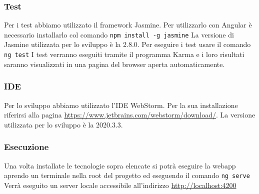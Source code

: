 \subsubsection{Test}
Per i test abbiamo utilizzato il framework Jasmine. Per utilizzarlo con Angular è necessario installarlo col comando \texttt{npm install -g jasmine} \newline
La versione di Jasmine utilizzata per lo sviluppo è la 2.8.0. \newline
Per eseguire i test usare il comando \texttt{ng test} \newline
I test verranno eseguiti tramite il programma Karma e i loro risultati saranno visualizzati in una pagina del browser aperta automaticamente.

\subsubsection{IDE}
Per lo sviluppo abbiamo utilizzato l'IDE WebStorm. Per la sua installazione riferirsi alla pagina \url{https://www.jetbrains.com/webstorm/download/}. La versione utilizzata per lo sviluppo è la 2020.3.3.

\subsubsection{Esecuzione}
Una volta installate le tecnologie sopra elencate si potrà eseguire la webapp aprendo un terminale nella root del progetto ed eseguendo il comando \texttt{ng serve} \newline
Verrà eseguito un server locale accessibile all'indirizzo \url{http://localhost:4200}


